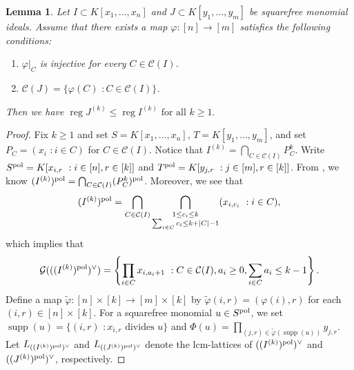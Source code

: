 \documentclass[12pt]{amsart}
\newtheorem{lemma}[thm]{Lemma}
\theoremstyle{definition}
\theoremstyle{remark}
\DeclareMathOperator{\supp}{supp}
\DeclareMathOperator{\reg}{reg}
\begin{document}
\begin{lemma}\label{key}
Let $I\subset K[x_{1},\ldots, x_{n}]$ and $J\subset K[y_{1},\ldots, y_{m}]$ be squarefree monomial ideals. Assume that there exists a map $\varphi:[n]\rightarrow[m]$ satisfies the following conditions:
\begin{enumerate}
\item $\varphi|_{C}$ is injective for every $C\in\mathcal{C}(I)$. 
\item $\mathcal{C}(J)=\{\varphi(C)\,\,: C\in\mathcal{C}(I)\}$.
\end{enumerate}
Then we have $\reg J^{(k)}\leq\reg I^{(k)}\mbox{ for all }k\geq1.$
\end{lemma}
\begin{proof}
Fix $k\geq1$ and set $S=K[x_{1},\ldots, x_{n}]$, $T=K[y_{1},\ldots, y_{m}]$, and set $P_{C}=(x_{i}\,\,: i\in C)$ for $C\in\mathcal{C}(I)$. Notice that $I^{(k)}=\bigcap_{C\in\mathcal{C}(I)}P_{C}^{k}$. Write $S^{\rm pol}=K[x_{i,r}\,\,: i\in[n], r\in[k]]$ and $T^{\rm pol}=K[y_{j,r}\,\,: j\in[m],r\in[k]]$. From \cite[Proposition 2.3]{f2006}, we know $(I^{(k)})^{\rm pol}=\bigcap_{C\in\mathcal{C}(I)}(P_{C}^{k})^{\rm pol}$. Moreover, we see that 
$$(I^{(k)})^{\rm pol}=\bigcap_{C\in\mathcal{C}(I)}\bigcap_{\substack{1\leq c_{i}\leq k\\ \sum_{i\in C}c_{i}\leq k+|C|-1}}(x_{i,c_{i}}\,\,: i\in C),$$
which implies that 
$$\mathcal{G}(((I^{(k)})^{\rm pol})^{\vee})=\left\{\prod_{i\in C}x_{i,a_{i}+1}\,\,: C\in\mathcal{C}(I), a_{i}\geq0,\sum_{i\in C}a_{i}\leq k-1\right\}.$$
Define a map $\tilde{\varphi}:[n]\times[k]\rightarrow[m]\times[k]$ by $\tilde{\varphi}(i,r)=(\varphi(i), r)$ for each $(i,r)\in[n]\times[k]$. For a squarefree monomial $u\in S^{\rm pol}$, we set $\supp(u)=\{(i,r)\,\,: x_{i,r}\mbox{ divides }u\}$ and $\Phi(u)=\prod_{(j,r)\in\tilde{\varphi}(\supp(u))}y_{j,r}$. Let $L_{((I^{(k)})^{\rm pol})^{\vee}}$ and $L_{((J^{(k)})^{\rm pol})^{\vee}}$ denote the lcm-lattices of $((I^{(k)})^{\rm pol})^{\vee}$ and $((J^{(k)})^{\rm pol})^{\vee}$, respectively. 

\end{proof}
\end{document}
